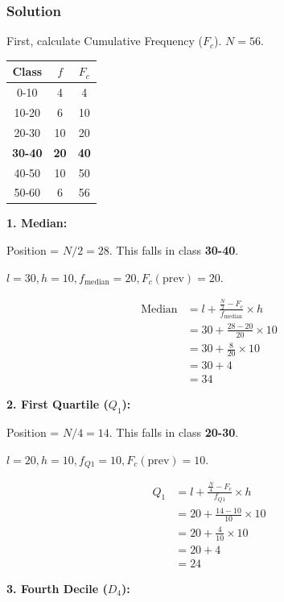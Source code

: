 \documentclass[12pt, a4paper]{article}
\begin{document}
\subsubsection*{Solution}
First, calculate Cumulative Frequency ($F_c$). $N = 56$.
\begin{center}
\begin{tabular}{|c|c|c|}
\hline
\textbf{Class} & $f$ & $F_c$ \\ \hline
0-10 & 4 & 4 \\ \hline
10-20 & 6 & 10 \\ \hline
20-30 & 10 & 20 \\ \hline
\textbf{30-40} & \textbf{20} & \textbf{40} \\ \hline
40-50 & 10 & 50 \\ \hline
50-60 & 6 & 56 \\ \hline
\end{tabular}
\end{center}

\textbf{1. Median:}

Position = $N/2 = 28$. This falls in class \textbf{30-40}.

$l = 30, h = 10, f_{\text{median}} = 20, F_c (\text{prev}) = 20$.

\begin{align*}
\text{Median} &= l + \frac{\frac{N}{2} - F_c}{f_{\text{median}}} \times h \\
              &= 30 + \frac{28 - 20}{20} \times 10 \\
              &= 30 + \frac{8}{20} \times 10 \\
              &= 30 + 4 \\
              &= 34
\end{align*}

\textbf{2. First Quartile ($Q_1$):}

Position = $N/4 = 14$. This falls in class \textbf{20-30}.

$l = 20, h = 10, f_{Q1} = 10, F_c (\text{prev}) = 10$.

\begin{align*}
Q_1 &= l + \frac{\frac{N}{4} - F_c}{f_{Q1}} \times h \\
    &= 20 + \frac{14 - 10}{10} \times 10 \\
    &= 20 + \frac{4}{10} \times 10 \\
    &= 20 + 4 \\
    &= 24
\end{align*}

\textbf{3. Fourth Decile ($D_4$):}
\end{document}
